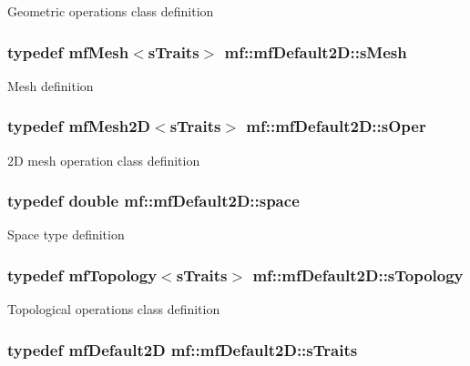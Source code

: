 \label{structmf_1_1mfDefault2D_a974a8a9297a6c7dbe28a3aae93ec0932}
Geometric operations class definition \hypertarget{structmf_1_1mfDefault2D_a8d813cb3f2395cfcfeaa8bd4f9c5eade}{
\subsubsection[{sMesh}]{\setlength{\rightskip}{0pt plus 5cm}typedef {\bf mfMesh}$<${\bf sTraits}$>$ {\bf mf::mfDefault2D::sMesh}}}
\label{structmf_1_1mfDefault2D_a8d813cb3f2395cfcfeaa8bd4f9c5eade}
Mesh definition \hypertarget{structmf_1_1mfDefault2D_a62b4225279579e884393a540e2e628cb}{
\subsubsection[{sOper}]{\setlength{\rightskip}{0pt plus 5cm}typedef {\bf mfMesh2D}$<${\bf sTraits}$>$ {\bf mf::mfDefault2D::sOper}}}
\label{structmf_1_1mfDefault2D_a62b4225279579e884393a540e2e628cb}
2D mesh operation class definition \hypertarget{structmf_1_1mfDefault2D_adb9cddf677f4712bef5bfcb90f64d2f9}{
\subsubsection[{space}]{\setlength{\rightskip}{0pt plus 5cm}typedef double {\bf mf::mfDefault2D::space}}}
\label{structmf_1_1mfDefault2D_adb9cddf677f4712bef5bfcb90f64d2f9}
Space type definition \hypertarget{structmf_1_1mfDefault2D_aa4faa97e437f812f5bad578e7862ce0f}{
\subsubsection[{sTopology}]{\setlength{\rightskip}{0pt plus 5cm}typedef {\bf mfTopology}$<${\bf sTraits}$>$ {\bf mf::mfDefault2D::sTopology}}}
\label{structmf_1_1mfDefault2D_aa4faa97e437f812f5bad578e7862ce0f}
Topological operations class definition \hypertarget{structmf_1_1mfDefault2D_a8139211f36d360a0221d3a8e8221bbce}{
\subsubsection[{sTraits}]{\setlength{\rightskip}{0pt plus 5cm}typedef {\bf mfDefault2D} {\bf mf::mfDefault2D::sTraits}}}
